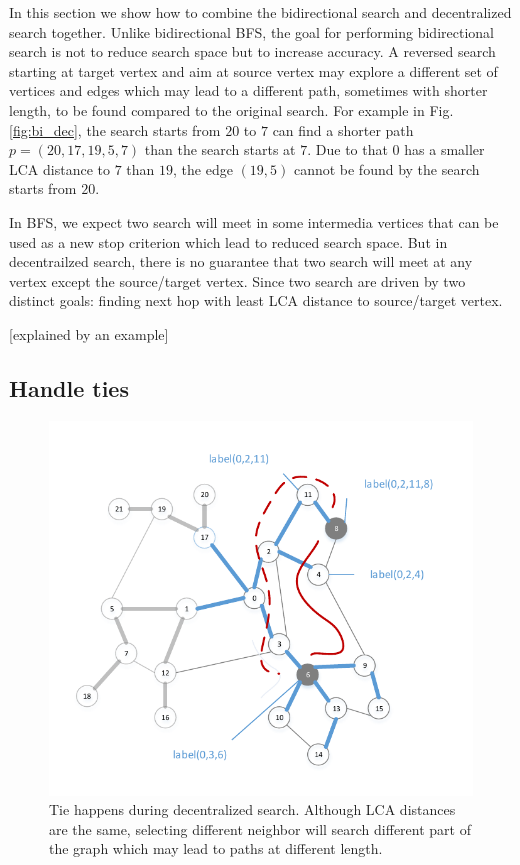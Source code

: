 In this section we show how to combine the bidirectional search and decentralized search together. Unlike bidirectional BFS, the goal for performing bidirectional search is not to reduce search space but to increase accuracy. A reversed search starting at target vertex and aim at source vertex may explore a different set of vertices and edges which may lead to a different path, sometimes with shorter length, to be found compared to the original search. For example in Fig. \ref{fig:bi_dec}, the search starts from $20$ to $7$ can find a shorter path $p = (20, 17, 19, 5, 7)$ than the search starts at $7$. Due to that $0$ has a smaller LCA distance to $7$ than $19$, the edge $(19, 5)$ cannot be found by the search starts from $20$. 

In BFS, we expect two search will meet in some intermedia vertices that can be used as a new stop criterion which lead to reduced search space. But in decentrailzed search, there is no guarantee that two search will meet at any vertex except the source/target vertex. Since two search are driven by two distinct goals: finding next hop with least LCA distance to source/target vertex. 

[explained by an example]

\subsection{Handle ties}

\begin{figure}[t]
    \centering
    \includegraphics[width=\linewidth]{./figures/new_illustrate/tie.pdf}
    \caption{Tie happens during decentralized search. Although LCA distances are the same, selecting different neighbor will search different part of the graph which may lead to paths at different length.}
    \label{fig:tie}
\end{figure}

